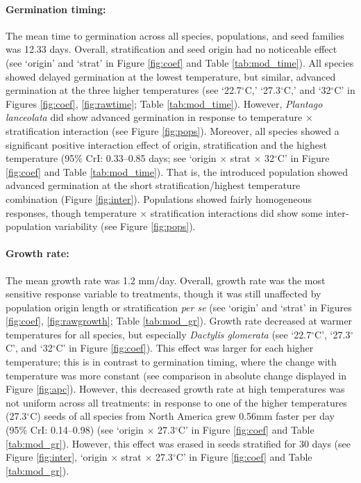 \documentclass[11pt]{article}\usepackage[]{graphicx}\usepackage[]{color}
\begin{document}
	\paragraph{Germination timing:} The mean time to germination across all species, populations, and seed families was 12.33 days.   Overall, stratification and seed origin had no noticeable effect (see `origin' and `strat' in Figure \ref{fig:coef} and Table \ref{tab:mod_time}). All species showed delayed germination at the lowest temperature, but similar, advanced germination at the  three higher temperatures (see `22.7$^{\circ}$C,' `27.3$^{\circ}$C,' and `32$^{\circ}$C' in Figures \ref{fig:coef}, \ref{fig:rawtime}; Table \ref{tab:mod_time}). However, \textit{Plantago lanceolata} did show advanced germination in response to temperature $\times$ stratification interaction (see Figure \ref{fig:pops}).  Moreover, all species showed a significant positive interaction effect of origin, stratification and the highest temperature (95\% CrI: 0.33--0.85 days; see `origin $\times$ strat $\times$ 32$^{\circ}$C' in Figure \ref{fig:coef} and Table \ref{tab:mod_time}). That is, the introduced population showed advanced germination at the short stratification/highest temperature combination (Figure \ref{fig:inter}).  Populations showed fairly homogeneous responses, though temperature $\times$ stratification interactions did show some inter-population variability (see Figure \ref{fig:pops}). 
	\paragraph{Growth rate:} The mean growth rate was 1.2 mm/day. Overall, growth rate was the most sensitive response variable to treatments, though it was still unaffected by population origin length or stratification \textit{per se} (see `origin' and `strat' in Figures \ref{fig:coef}, \ref{fig:rawgrowth}; Table \ref{tab:mod_gr}). Growth rate decreased at warmer temperatures for all species, but especially \textit{Dactylis glomerata} (see `22.7$^{\circ}$C', `27.3$^{\circ}$C', and `32$^{\circ}$C' in Figure \ref{fig:coef}). This effect was larger for each higher temperature; this is in contrast to germination timing, where the change with temperature was more constant (see comparison in absolute change displayed in Figure \ref{fig:apc}). However, this decreased growth rate at high temperatures was not uniform across all treatments: in response to one of the higher temperatures (27.3$^{\circ}$C) seeds of all species from North America grew 0.56mm faster per day (95\% CrI: 0.14--0.98) (see `origin $\times$  27.3$^{\circ}$C' in Figure \ref{fig:coef} and Table \ref{tab:mod_gr}). However, this  effect was erased in seeds stratified for 30 days %
	(see Figure \ref{fig:inter},  `origin $\times$ strat $\times$ 27.3$^{\circ}$C' in Figure \ref{fig:coef} and Table \ref{tab:mod_gr}). 
	
\end{document}
